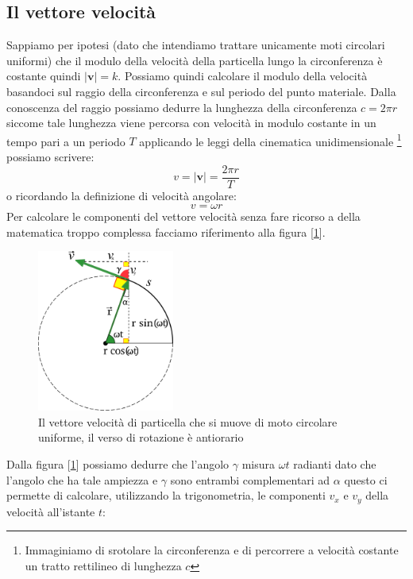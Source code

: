 \documentclass[a4paper,10pt,oneside]{article}
\begin{document}
\subsection*{Il vettore velocità}
Sappiamo per ipotesi (dato che intendiamo trattare unicamente moti circolari uniformi) che il modulo della velocità della particella lungo la circonferenza è costante quindi $|\mathbf{v}|=k$. Possiamo quindi calcolare il modulo della velocità basandoci sul raggio della circonferenza e sul periodo del punto materiale. Dalla conoscenza del raggio possiamo dedurre la lunghezza della circonferenza $c=2\pi r$ siccome tale lunghezza viene percorsa con velocità in modulo costante in un tempo pari a un periodo $T$ applicando le leggi della cinematica unidimensionale \footnote{Immaginiamo di srotolare la circonferenza e di percorrere a velocità costante un tratto rettilineo di lunghezza $c$} possiamo scrivere:
\begin{equation}
 v=|\mathbf{v}|=\frac{2\pi r}{T}
\end{equation}
o ricordando la definizione di velocità angolare:
\begin{equation}
 v=\omega r
\end{equation}
Per calcolare le componenti del vettore velocità senza fare ricorso a della matematica troppo complessa facciamo riferimento alla figura [\ref{fig:vet_veloc}].
\begin{figure}[H]
\begin{center}
 \includegraphics[width=0.4\textwidth]{./immagini/vet_velocita.png}
 \caption{Il vettore velocità di particella che si muove di moto circolare uniforme, il verso di rotazione è antiorario}
 \label{fig:vet_veloc}
\end{center}
\end{figure}
Dalla figura [\ref{fig:vet_veloc}] possiamo dedurre che l'angolo $\gamma$ misura $\omega t$ radianti dato che l'angolo che ha tale ampiezza e $\gamma$ sono entrambi complementari ad $\alpha$ questo ci permette di calcolare, utilizzando la trigonometria, le componenti $v_x$ e $v_y$ della velocità all'istante $t$:
\end{document}
